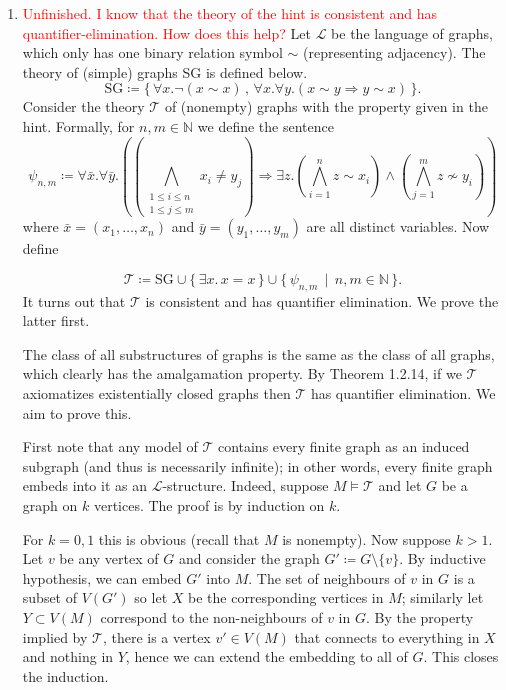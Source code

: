 \documentclass{article}
\begin{document}
\begin{enumerate}[leftmargin=*]
		\item \textcolor{red}{Unfinished. I know that the theory of the hint is consistent and has quantifier-elimination. How does this help?} Let $\mathcal{L}$ be the language of graphs, which only has one binary relation symbol $\sim$ (representing adjacency). The theory of (simple) graphs SG is defined below.
		\[
			\text{SG}\coloneqq \{\,\forall x. \neg(x\sim x) \,,\, \forall x.\forall y. (x\sim y \Rightarrow y\sim x)\,\}.
		\]
		Consider the theory $\mathcal{T}$ of (nonempty) graphs with the property given in the hint. Formally, for $n,m\in\mathbb{N}$ we define the sentence
		\[
			\psi_{n,m} \coloneqq \forall \bar{x}.\forall\bar{y}.\left(\left( \bigwedge_{\substack{1\leq i \leq n\\ 1\leq j\leq m}} x_i\neq y_j\right)  \Rightarrow  \exists z. \left(\bigwedge_{i = 1}^n z \sim x_i\right) \wedge \left(\bigwedge_{j = 1}^m z \nsim y_i\right)\right)
		\]
		where $\bar{x} = (x_1,\ldots,x_n)$ and $\bar{y} = (y_1,\ldots,y_m)$ are all distinct variables. Now define 
		
		\[
			\mathcal{T} \coloneqq \text{SG} \cup \{\,\exists x.\, x = x\,\} \cup \{\,\psi_{n,m} \,\mid\, n,m\in\mathbb{N}\,\}.
		\]
		It turns out that $\mathcal{T}$ is consistent and has quantifier elimination. We prove the latter first.
		
		The class of all substructures of graphs is the same as the class of all graphs, which clearly has the amalgamation property. By Theorem 1.2.14, if we $\mathcal{T}$ axiomatizes existentially closed graphs then $\mathcal{T}$ has quantifier elimination. We aim to prove this.
		
		First note that any model of $\mathcal{T}$ contains every finite graph as an induced subgraph (and thus is necessarily infinite); in other words, every finite graph embeds into it as an $\mathcal{L}$-structure. Indeed, suppose $M \models \mathcal{T}$ and let $G$ be a graph on $k$ vertices. The proof is by induction on $k$.
		
		For $k =0,1$ this is obvious (recall that $M$ is nonempty). Now suppose $k>1$. Let $v$ be any vertex of $G$ and consider the graph $G'\coloneqq G\setminus\{v\}$. By inductive hypothesis, we can embed $G'$ into $M$. The set of neighbours of $v$ in $G$ is a subset of $V(G')$ so let $X$ be the corresponding vertices in $M$; similarly let $Y\subset V(M)$ correspond to the non-neighbours of $v$ in $G$. By the property implied by $\mathcal{T}$, there is a vertex $v'\in V(M)$ that connects to everything in $X$ and nothing in $Y$, hence we can extend the embedding to all of $G$. This closes the induction.
		

\end{enumerate}
\end{document}
